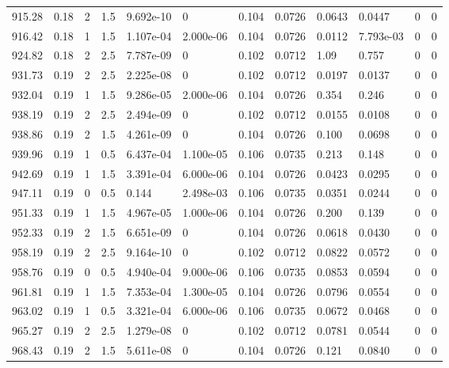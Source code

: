 \documentclass[preview]{standalone}
\begin{document}
{{{{{{{\begin{tabular}{L{1.2cm}C{1.2cm} C{0.3cm}C{0.5cm} C{1.4cm}C{1.4cm} C{1.4cm}C{1.4cm} C{1.6cm}C{1.6cm} C{1.6cm}C{1.6cm}}
  915.28  &  0.18  & 2     & 1.5 &  9.692e-10  & 0  &  0.104&   0.0726& 0.0643 & 0.0447   &  0 & 0  \\ 
  916.42  &  0.18  & 1     & 1.5 &  1.107e-04  & 2.000e-06  &  0.104&   0.0726& 0.0112 & 7.793e-03   &  0 & 0  \\ 
  924.82  &  0.18  & 2     & 2.5 &  7.787e-09  & 0  &  0.102&   0.0712& 1.09 & 0.757   &  0 & 0  \\ 
  931.73  &  0.19  & 2     & 2.5 &  2.225e-08  & 0  &  0.102&   0.0712& 0.0197 & 0.0137   &  0 & 0  \\ 
  932.04  &  0.19  & 1     & 1.5 &  9.286e-05  & 2.000e-06  &  0.104&   0.0726& 0.354 & 0.246   &  0 & 0  \\ 
  938.19  &  0.19  & 2     & 2.5 &  2.494e-09  & 0  &  0.102&   0.0712& 0.0155 & 0.0108   &  0 & 0  \\ 
  938.86  &  0.19  & 2     & 1.5 &  4.261e-09  & 0  &  0.104&   0.0726& 0.100 & 0.0698   &  0 & 0  \\ 
  939.96  &  0.19  & 1     & 0.5 &  6.437e-04  & 1.100e-05  &  0.106&   0.0735& 0.213 & 0.148   &  0 & 0  \\ 
  942.69  &  0.19  & 1     & 1.5 &  3.391e-04  & 6.000e-06  &  0.104&   0.0726& 0.0423 & 0.0295   &  0 & 0  \\ 
  947.11  &  0.19  & 0     & 0.5 &  0.144  & 2.498e-03  &  0.106&   0.0735& 0.0351 & 0.0244   &  0 & 0  \\ 
  951.33  &  0.19  & 1     & 1.5 &  4.967e-05  & 1.000e-06  &  0.104&   0.0726& 0.200 & 0.139   &  0 & 0  \\ 
  952.33  &  0.19  & 2     & 1.5 &  6.651e-09  & 0  &  0.104&   0.0726& 0.0618 & 0.0430   &  0 & 0  \\ 
  958.19  &  0.19  & 2     & 2.5 &  9.164e-10  & 0  &  0.102&   0.0712& 0.0822 & 0.0572   &  0 & 0  \\ 
  958.76  &  0.19  & 0     & 0.5 &  4.940e-04  & 9.000e-06  &  0.106&   0.0735& 0.0853 & 0.0594   &  0 & 0  \\ 
  961.81  &  0.19  & 1     & 1.5 &  7.353e-04  & 1.300e-05  &  0.104&   0.0726& 0.0796 & 0.0554   &  0 & 0  \\ 
  963.02  &  0.19  & 1     & 0.5 &  3.321e-04  & 6.000e-06  &  0.106&   0.0735& 0.0672 & 0.0468   &  0 & 0  \\ 
  965.27  &  0.19  & 2     & 2.5 &  1.279e-08  & 0  &  0.102&   0.0712& 0.0781 & 0.0544   &  0 & 0  \\ 
  968.43  &  0.19  & 2     & 1.5 &  5.611e-08  & 0  &  0.104&   0.0726& 0.121 & 0.0840   &  0 & 0  \\ 

\end{tabular}}}}}}}}
\end{document}
